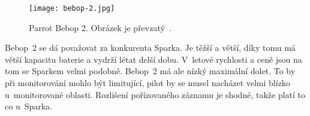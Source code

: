 \begin{figure}[H]
    \centering
    \texttt{[image: bebop-2.jpg]}
    \caption[Parrot Bebop 2]{Parrot Bebop 2. Obrázek je převzatý~\cite{specsParrot}.}
    \label{fig_bebop-2}
\end{figure}

Bebop~2 se dá považovat za konkurenta Sparka. Je těžší a větší, díky tomu má větší kapacitu baterie a vydrží létat delší dobu. V~letové rychlosti a ceně jsou na tom se Sparkem velmi podobně. Bebop~2 má ale nízký maximální dolet. To by při monitorování mohlo být limitující, pilot by se musel nacházet velmi blízko u~monitorované oblasti. Rozlišení pořízovaného záznamu je shodné, takže platí to co u~Sparka.

